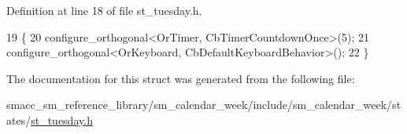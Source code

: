 Definition at line 18 of file st\+\_\+tuesday.\+h.


\begin{DoxyCode}
19     \{
20         configure\_orthogonal<OrTimer, CbTimerCountdownOnce>(5);   
21         configure\_orthogonal<OrKeyboard, CbDefaultKeyboardBehavior>();
22     \}
\end{DoxyCode}


The documentation for this struct was generated from the following file\+:\begin{DoxyCompactItemize}
\item 
smacc\+\_\+sm\+\_\+reference\+\_\+library/sm\+\_\+calendar\+\_\+week/include/sm\+\_\+calendar\+\_\+week/states/\hyperlink{st__tuesday_8h}{st\+\_\+tuesday.\+h}\end{DoxyCompactItemize}
